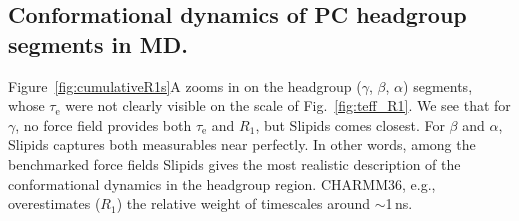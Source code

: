 \documentclass[journal=jcisd8,manuscript=article,layout=twocolumn]{achemso}
\begin{document}

\subsection*{Conformational dynamics of PC headgroup segments in MD.}

Figure~\ref{fig:cumulativeR1s}A zooms in on the headgroup ($\gamma$, $\beta$, $\alpha$) segments,
whose $\tau_\mathrm e$ were not clearly visible on the scale of Fig.~\ref{fig:teff_R1}.
%
We see that for $\gamma$,
no force field provides both $\tau_\mathrm e$ and $R_1$,
but Slipids comes closest.
%
For $\beta$ and $\alpha$,
Slipids captures both measurables near perfectly.  
%
In other words, among the benchmarked force fields Slipids gives the most realistic description of the conformational dynamics in the headgroup region.
CHARMM36, e.g., overestimates ($R_1$) the relative weight of timescales around $\sim$1\,ns.
\end{document}
